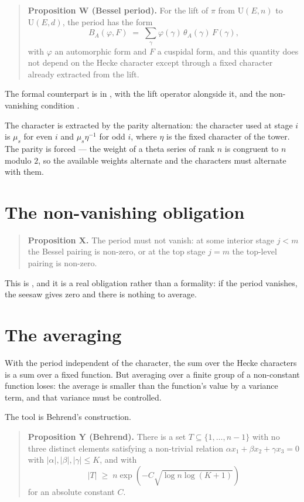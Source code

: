 \begin{quote}
\textbf{Proposition W (Bessel period).} For the lift of $\pi$ from
$\mathrm{U}(E,n)$ to $\mathrm{U}(E,d)$, the period has the form
\[
B_A(\varphi, F) \;=\; \sum_{\gamma} \varphi(\gamma)\,\theta_A(\gamma)\,F(\gamma),
\]
with $\varphi$ an automorphic form and $F$ a cuspidal form, and this
quantity does not depend on the Hecke character except through a fixed
character already extracted from the lift.
\end{quote}

The formal counterpart is  in
, with the lift operator 
alongside it, and the non-vanishing condition .

The character is extracted by the parity alternation: the character used at
stage $i$ is $\mu_s$ for even $i$ and $\mu_s\eta^{-1}$ for odd $i$, where
$\eta$ is the fixed character of the tower. The parity is forced --- the
weight of a theta series of rank $n$ is congruent to $n$ modulo $2$, so the
available weights alternate and the characters must alternate with them.

\section{The non-vanishing obligation}\begin{quote}
\textbf{Proposition X.} The period must not vanish: at some interior stage
$j < m$ the Bessel pairing is non-zero, or at the top stage $j = m$ the
top-level pairing is non-zero.
\end{quote}

This is , and it is a real obligation rather than a formality: if
the period vanishes, the seesaw gives zero and there is nothing to average.

\section{The averaging}With the period independent of the character, the sum over the Hecke
characters is a sum over a fixed function. But averaging over a finite group
of a non-constant function loses: the average is smaller than the function's
value by a variance term, and that variance must be controlled.

The tool is Behrend's construction.

\begin{quote}
\textbf{Proposition Y (Behrend).} There is a set $T \subseteq \{1,\dots,n-1\}$
with no three distinct elements satisfying a non-trivial relation
$\alpha x_1 + \beta x_2 + \gamma x_3 = 0$ with $|\alpha|,|\beta|,|\gamma| \le K$,
and with
\[
|T| \;\ge\; n \exp\!\left(-C\sqrt{\log n \log(K+1)}\right)
\]
for an absolute constant $C$.
\end{quote}

